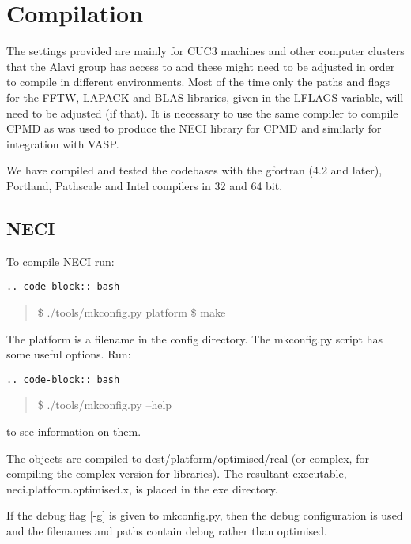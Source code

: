 \documentclass[openany,a4paper,10pt,english]{manual}
\begin{document}
\section{Compilation}

The settings provided are mainly for CUC3 machines and other computer clusters
that the Alavi group has access to and these might need to be adjusted in order
to compile in different environments.  Most of the time only the paths and
flags for the FFTW, LAPACK and BLAS libraries, given in the LFLAGS variable,
will need to be adjusted (if that).  It is necessary to use the same compiler
to compile CPMD as was used to produce the NECI library for CPMD and similarly
for integration with VASP.

We have compiled and tested the codebases with the gfortran (4.2 and later),
Portland, Pathscale and Intel compilers in 32 and 64 bit.


\subsection{NECI}

To compile NECI run:

\begin{Verbatim}[commandchars=@\[\]]
.. code-block:: bash
\end{Verbatim}
\begin{quote}

\$ ./tools/mkconfig.py platform
\$ make
\end{quote}

The platform is a filename in the config directory.  The mkconfig.py script
has some useful options.  Run:

\begin{Verbatim}[commandchars=@\[\]]
.. code-block:: bash
\end{Verbatim}
\begin{quote}

\$ ./tools/mkconfig.py --help
\end{quote}

to see information on them.

The objects are compiled to dest/platform/optimised/real (or complex, for
compiling the complex version for libraries).  The resultant executable,
neci.platform.optimised.x, is placed in the exe directory.

If the debug flag {[}-g{]} is given to mkconfig.py, then the debug configuration is used and
the filenames and paths contain debug rather than optimised.
\end{document}
